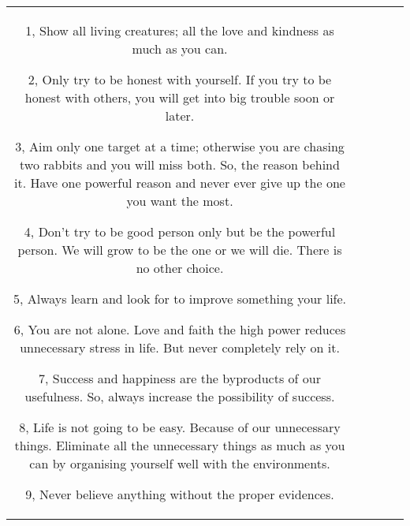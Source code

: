 \documentclass[11pt]{article}
\newlength\mylength
\begin{document}
\begin{center}
\begin{longtable}{|C{.65\mylength}|C{.30\mylength}|C{.12\mylength}|C{.12\mylength}|C{.12\mylength}|}
1, Show all living creatures; all the love and kindness as much as you can.

2, Only try to be honest with yourself. If you try to be honest with others, you will get into big trouble soon or later.

3, Aim only one target at a time; otherwise you are chasing two rabbits and you will miss both. So, the reason behind it. Have one powerful reason and never ever give up the one you want the most.

4, Don't try to be good person only but be the powerful person. We will grow to be the one or we will die. There is no other choice. 

5, Always learn and look for to improve something your life. 

6, You are not alone. Love and faith the high power reduces unnecessary stress in life. But never completely rely on it. 

7,  Success and happiness are the byproducts of our usefulness. So, always increase the possibility of success.

8, Life is not going to be easy. Because of our unnecessary things. Eliminate all the unnecessary things as much as you can by organising yourself well with the environments. 

9, Never believe anything without the proper evidences. 


\end{longtable}
\end{center}
\end{document}
